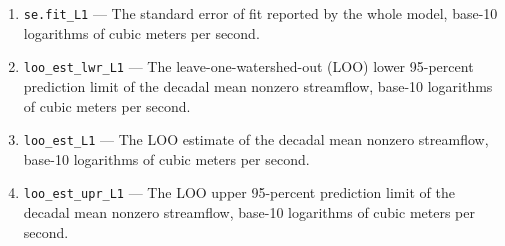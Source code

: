 \documentclass[1p, authoryear, 11pt, times, preprint]{elsarticle}
\newcommand{\code}[1]{{\color{black}%
                       \mbox{\lstinline[basicstyle={\small\ttfamily},
                                        keywordstyle=\scriptsize\ttfamily]|#1|}}}
\begin{document}
\begin{enumerate}
\item \code{se.fit_L1} --- The standard error of fit reported by the whole model, base-10 logarithms of cubic meters per second.
\item \code{loo_est_lwr_L1} --- The leave-one-watershed-out (LOO) lower 95-percent prediction limit of the decadal mean nonzero streamflow, base-10 logarithms of cubic meters per second.
\item \code{loo_est_L1} --- The LOO estimate of the decadal mean nonzero streamflow, base-10 logarithms of cubic meters per second.
\item \code{loo_est_upr_L1} --- The LOO upper 95-percent prediction limit of the decadal  mean nonzero streamflow, base-10 logarithms of cubic meters per second.
\end{enumerate}


\end{document}
